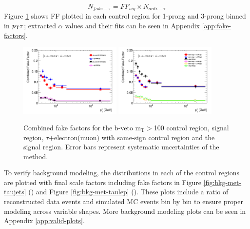 		\begin{equation}\label{eqn:nfakethad}
			N_{fake-\tau} = FF_{sig} \times N_{anti-\tau} 
		\end{equation}
		Figure \ref{fig:FF_COM} shows FF plotted in each control region for 1-prong and 3-prong \tauhad binned in $p_{\text{T}}{\tau}$; extracted $\alpha$ values and their fits can be seen in Appendix \ref{app:fake-factors}.
		\begin{figure}[h!]
		  \begin{center}
		    \includegraphics[width=0.45\textwidth]{chapters/chapter6_HPlus/images/FFs/FFs_COM_inclusive__taujet.png} \qquad
		    \includegraphics[width=0.45\textwidth]{chapters/chapter6_HPlus/images/FFs/FFs_COM_inclusive__taulep.png} 
		  \end{center}
		  \caption{
		Combined fake factors for the \taujets b-veto $\mathrm{m_{T}}>$100 control region, \taujets signal region, $\tau$+electron(muon) with same-sign control region and the \taulep signal region. Error bars represent systematic uncertainties of the method. 
		}
		  \label{fig:FF_COM}
		\end{figure}


		To verify background modeling, the \Etm distributions in each of the control regions are plotted with final scale factors including fake factors in Figure \ref{fig:bkg-met-taujets} (\taujets) and Figure \ref{fig:bkg-met-taulep} (\taulep). These plots include a ratio of reconstructed data events and simulated MC events bin by bin to ensure proper modeling across variable shapes. More background modeling plots can be seen in Appendix \ref{app:valid-plots}.

